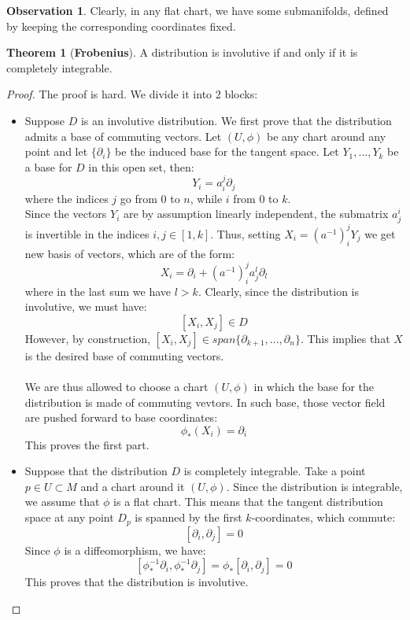 \documentclass[12pt,a4paper]{report}
\theoremstyle{definition}
\theoremstyle{Theorem}
\newtheorem{Theo}[Def]{Theorem}
\theoremstyle{definition}
\theoremstyle{definition}
\newtheorem{Obs}[Def]{Observation}
\begin{document}
 		\begin{Obs}
 			Clearly, in any flat chart, we have some submanifolds, defined by keeping the corresponding coordinates fixed.
 		\end{Obs}
 		\begin{Theo}[\textbf{Frobenius}]
 			A distribution is involutive if and only if it is completely integrable.
 		\end{Theo}
 		\begin{proof}
 			The proof is hard. We divide it into 2 blocks:
 			\begin{itemize}
 				\item Suppose $D$ is an involutive distribution. We first prove that the distribution admits a base of commuting vectors. Let $(U,\phi)$ be any chart around any point and let $\{\partial_i\}$ be the induced base for the tangent space. Let $Y_1,...,Y_k$ be a base for $D$ in this open set, then:
 				$$Y_i=a^j_i\partial_j$$
 				where the indices $j$ go from $0$ to $n$, while $i$ from $0$ to $k$.\\
 				Since the vectors $Y_i$ are by assumption linearly independent, the submatrix $a^i_j$ is invertible in the indices $i,j\in[1,k]$. Thus, setting $X_i=(a^{-1})^j_i Y_j$ we get new basis of vectors, which are of the form:
 				$$X_i=\partial_i+(a^{-1})^j_i a^l_j \partial_l$$
 				where in the last sum we have $l>k$.
 				Clearly, since the distribution is involutive, we must have:
 				$$[X_i,X_j]\in D$$
 				However, by construction, $[X_i,X_j]\in span\{\partial_{k+1},...,\partial_n\}$. This implies that $X$ is the desired base of commuting vectors.\\
 				\\
 				We are thus allowed to choose a chart $(U,\phi)$ in which the base for the distribution is made of commuting vevtors. In such base, those vector field are pushed forward to base coordinates:
 				$$\phi_*(X_i)=\partial_i$$
 				This proves the first part.
 				\item Suppose that the distribution $D$ is completely integrable. Take a point $p\in U\subset M$ and a chart around it $(U,\phi)$. Since the distribution is integrable, we assume that $\phi$ is a flat chart. This means that the tangent distribution space at any point $D_p$ is spanned by the first $k$-coordinates, which commute:
 				$$[\partial_i,\partial_j]=0$$
 				Since $\phi$ is a diffeomorphism, we have:
 				$$[\phi^{-1}_*\partial_i,\phi^{-1}_*\partial_j]=\phi_*[\partial_i,\partial_j]=0$$
 				This proves that the distribution is involutive.
 			\end{itemize}
 		\end{proof}
\end{document}
